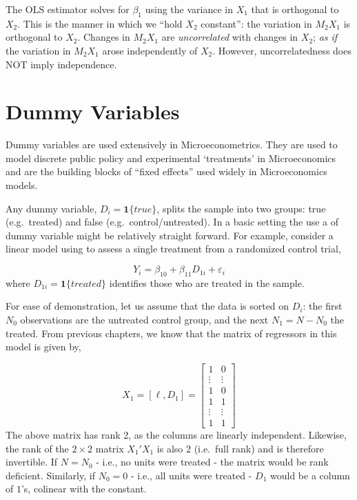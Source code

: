 \documentclass[
  letterpaper,
  DIV=11,
  numbers=noendperiod]{scrreprt}
\begin{document}
The OLS estimator solves for \(\beta_1\) using the variance in \(X_1\)
that is orthogonal to \(X_2\). This is the manner in which we ``hold
\(X_2\) constant'': the variation in \(M_2X_1\) is orthogonal to
\(X_2\). Changes in \(M_2X_1\) are \emph{uncorrelated} with changes in
\(X_2\); \emph{as if} the variation in \(M_2X_1\) arose independently of
\(X_2\). However, uncorrelatedness does NOT imply independence.


\hypertarget{sec-dummy}{%
\chapter{Dummy Variables}\label{sec-dummy}}

Dummy variables are used extensively in Microeconometrics. They are used
to model discrete public policy and experimental `treatments' in
Microeconomics and are the building blocks of ``fixed effects'' used
widely in Microeconomics models.

Any dummy variable, \(D_i=\mathbf{1}\{true\}\), splits the sample into
two groups: true (e.g.~treated) and false (e.g.~control/untreated). In a
basic setting the use a of dummy variable might be relatively straight
forward. For example, consider a linear model using to assess a single
treatment from a randomized control trial,

\[
Y_i = \beta_{10}+\beta_{11} D_{1i} + \varepsilon_i
\] where \(D_{1i} = \mathbf{1}\{treated\}\) identifies those who are
treated in the sample.

For ease of demonstration, let us assume that the data is sorted on
\(D_i\): the first \(N_0\) observations are the untreated control group,
and the next \(N_1 = N-N_0\) the treated. From previous chapters, we
know that the matrix of regressors in this model is given by,

\[
X_1=[\ell,D_1]=\begin{bmatrix}1 & 0 \\ \vdots & \vdots \\ 1 & 0 \\ 1 & 1 \\ \vdots & \vdots \\ 1 & 1 \end{bmatrix}
\] The above matrix has rank 2, as the columns are linearly independent.
Likewise, the rank of the \(2\times 2\) matrix \(X_1'X_1\) is also 2
(i.e.~full rank) and is therefore invertible. If \(N=N_0\) - i.e., no
units were treated - the matrix would be rank deficient. Similarly, if
\(N_0=0\) - i.e., all units were treated - \(D_1\) would be a column of
\(1\)'s, colinear with the constant.
\end{document}
